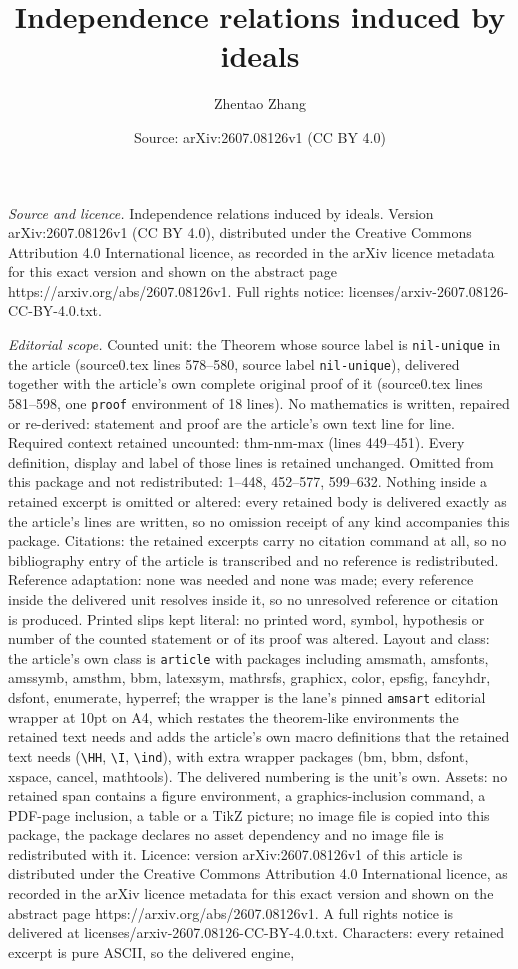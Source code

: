 \documentclass[10pt,a4paper]{amsart}
\title[Independence relations induced by ideals]{Independence relations induced by ideals}
\author{Zhentao Zhang}
\date{Source: arXiv:2607.08126v1 (CC BY 4.0)}
\begin{document}
\maketitle

\noindent\emph{Source and licence.} Independence relations induced by ideals. Version arXiv:2607.08126v1 (CC BY 4.0), distributed under the Creative Commons Attribution 4.0 International licence, as recorded in the arXiv licence metadata for this exact version and shown on the abstract page https://arxiv.org/abs/2607.08126v1. Full rights notice: licenses/arxiv-2607.08126-CC-BY-4.0.txt.\par\smallskip

\noindent\textit{Editorial scope.} Counted unit: the Theorem whose source label is \texttt{nil-unique} in the article (source0.tex lines 578--580, source label \texttt{nil-unique}), delivered together with the article's own complete original proof of it (source0.tex lines 581--598, one \texttt{proof} environment of 18 lines). No mathematics is written, repaired or re-derived: statement and proof are the article's own text line for line. Required context retained uncounted: thm-nm-max (lines 449--451). Every definition, display and label of those lines is retained unchanged. Omitted from this package and not redistributed: 1--448, 452--577, 599--632. Nothing inside a retained excerpt is omitted or altered: every retained body is delivered exactly as the article's lines are written, so no omission receipt of any kind accompanies this package. Citations: the retained excerpts carry no citation command at all, so no bibliography entry of the article is transcribed and no reference is redistributed. Reference adaptation: none was needed and none was made; every reference inside the delivered unit resolves inside it, so no unresolved reference or citation is produced. Printed slips kept literal: no printed word, symbol, hypothesis or number of the counted statement or of its proof was altered. Layout and class: the article's own class is \texttt{article} with packages including amsmath, amsfonts, amssymb, amsthm, bbm, latexsym, mathrsfs, graphicx, color, epsfig, fancyhdr, dsfont, enumerate, hyperref; the wrapper is the lane's pinned \texttt{amsart} editorial wrapper at 10pt on A4, which restates the theorem-like environments the retained text needs and adds the article's own macro definitions that the retained text needs (\texttt{\textbackslash HH}, \texttt{\textbackslash I}, \texttt{\textbackslash ind}), with extra wrapper packages (bm, bbm, dsfont, xspace, cancel, mathtools). The delivered numbering is the unit's own. Assets: no retained span contains a figure environment, a graphics-inclusion command, a PDF-page inclusion, a table or a TikZ picture; no image file is copied into this package, the package declares no asset dependency and no image file is redistributed with it. Licence: version arXiv:2607.08126v1 of this article is distributed under the Creative Commons Attribution 4.0 International licence, as recorded in the arXiv licence metadata for this exact version and shown on the abstract page https://arxiv.org/abs/2607.08126v1. A full rights notice is delivered at licenses/arxiv-2607.08126-CC-BY-4.0.txt. Characters: every retained excerpt is pure ASCII, so the delivered engine, 
\end{document}
